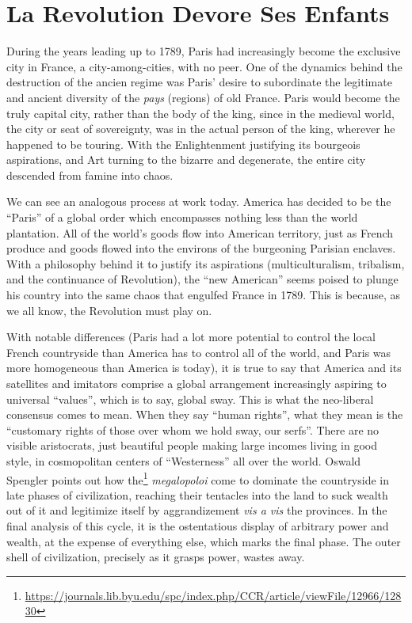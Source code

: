 \section{La Revolution Devore Ses Enfants}

During the years leading up to 1789, Paris had increasingly become the exclusive city in France, a city-among-cities, with no peer. One of the dynamics behind the destruction of the ancien regime was Paris' desire to subordinate the legitimate and ancient diversity of the \emph{pays} (regions) of old France. Paris would become the truly capital city, rather than the body of the king, since in the medieval world, the city or seat of sovereignty, was in the actual person of the king, wherever he happened to be touring. With the Enlightenment justifying its bourgeois aspirations, and Art turning to the bizarre and degenerate, the entire city descended from famine into chaos.

We can see an analogous process at work today. America has decided to be the ``Paris'' of a global order which encompasses nothing less than the world plantation. All of the world's goods flow into American territory, just as French produce and goods flowed into the environs of the burgeoning Parisian enclaves. With a philosophy behind it to justify its aspirations (multiculturalism, tribalism, and the continuance of Revolution), the ``new American'' seems poised to plunge his country into the same chaos that engulfed France in 1789. This is because, as we all know, the Revolution must play on.

With notable differences (Paris had a lot more potential to control the local French countryside than America has to control all of the world, and Paris was more homogeneous than America is today), it is true to say that America and its satellites and imitators comprise a global arrangement increasingly aspiring to universal ``values'', which is to say, global sway. This is what the neo-liberal consensus comes to mean. When they say ``human rights'', what they mean is the ``customary rights of those over whom we hold sway, our serfs''. There are no visible aristocrats, just beautiful people making large incomes living in good style, in cosmopolitan centers of ``Westerness'' all over the world. Oswald Spengler points out how the\footnote{\url{https://journals.lib.byu.edu/spc/index.php/CCR/article/viewFile/12966/12830}} \emph{megalopoloi} come to dominate the countryside in late phases of civilization, reaching their tentacles into the land to suck wealth out of it and legitimize itself by aggrandizement \emph{vis a vis} the provinces. In the final analysis of this cycle, it is the ostentatious display of arbitrary power and wealth, at the expense of everything else, which marks the final phase. The outer shell of civilization, precisely as it grasps power, wastes away.


